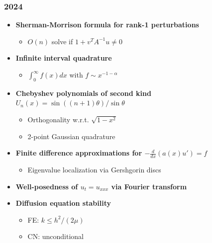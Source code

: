 \subsubsection*{2024}
\begin{itemize}
    \item \textbf{Sherman-Morrison formula for rank-1 perturbations}
        \begin{itemize}
            \item $O(n)$ solve if $1 + v^T A^{-1}u \neq 0$
        \end{itemize}
    \item \textbf{Infinite interval quadrature}
        \begin{itemize}
            \item $\int_0^\infty f(x)dx$ with $f \sim x^{-1-\alpha}$
        \end{itemize}
    \item \textbf{Chebyshev polynomials of second kind $U_n(x) = \sin((n+1)\theta)/\sin\theta$}
        \begin{itemize}
            \item Orthogonality w.r.t. $\sqrt{1-x^2}$
            \item 2-point Gaussian quadrature
        \end{itemize}
    \item \textbf{Finite difference approximations for $-\frac{d}{dx}(a(x)u') = f$}
        \begin{itemize}
            \item Eigenvalue localization via Gershgorin discs
        \end{itemize}
    \item \textbf{Well-posedness of $u_t = u_{xxx}$ via Fourier transform}
    \item \textbf{Diffusion equation stability}
        \begin{itemize}
            \item FE: $k \leq h^2/(2\mu)$
            \item CN: unconditional
        \end{itemize}
\end{itemize}

